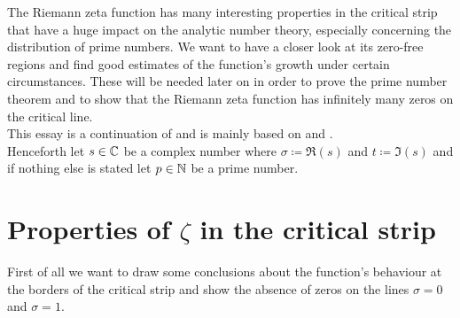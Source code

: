 The Riemann zeta function has many interesting properties in the critical strip that have a huge impact on the analytic number theory, especially concerning the distribution of prime numbers. We want to have a closer look at its zero-free regions and find good estimates of the function's growth under certain circumstances. These will be needed later on in order to prove the prime number theorem and to show that the Riemann zeta function has infinitely many zeros on the critical line. \\
This essay is a continuation of \cite{Jesacher2016} and is mainly based on \cite{Stein2003} and \cite{Titchmarsh1986}. \\
Henceforth let $s \in \mathbb{C}$ be a complex number where $\sigma \coloneqq \Re(s)$ and $t \coloneqq \Im(s)$ and if nothing else is stated let $p \in \mathbb{N}$ be a prime number.


\section{Properties of $\zeta$ in the critical strip}
First of all we want to draw some conclusions about the function's behaviour at the borders of the critical strip and show the absence of zeros on the lines $\sigma = 0$ and $\sigma = 1$.


